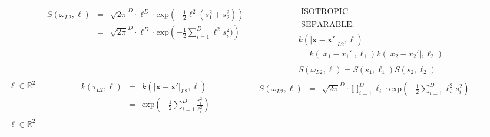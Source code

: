 \documentclass[onecolumn,a4paper,11pt]{article}
\begin{document}
\begin{landscape}
\begin{table}[H]
\begin{center}
\begin{tabular}{|c|c|c|c|}
       & \multicolumn{1}{|p{8.2cm}|}{\small
         \begin{eqnarray*}
		S(\omega_{L2},\ell) &=& \sqrt{2\pi}^D \cdot \ell^D \cdot \mathrm{exp}\left(-\frac{1}{2} \ell^2 (s_1^2 + s_2^2) \right) \\
		&=& \sqrt{2\pi}^D \cdot \ell^D \cdot \mathrm{exp}\left(-\frac{1}{2} \sum_{i=1}^D \ell^2 s_i^2) \right)
         \end{eqnarray*}
       }
       
       & \multicolumn{1}{|p{6.2cm}|}{\small
         \begin{eqnarray*}
        &&\text{-ISOTROPIC}\\
        \\
		&&\text{-SEPARABLE:} \\
		\\
		&&k(|\bm{x}-\bm{x}'|_{L2},\bm{\ell})\\
		 &&= k(|x_1-x_1'|,\ell_1)k(|x_2-x_2'|,\ell_2)\\
		 \\
		&&S(\omega_{L2},\bm{\ell})= S(s_1,\ell_1)S(s_2,\ell_2)
         \end{eqnarray*}
       }\\
        \cline{1-3}
         
       \multicolumn{1}{|p{1.5cm}|}{
       \vspace{1mm}
       $\bm{\ell} \in \mathbb{R}^2$
       }
       
         & \multicolumn{1}{|p{7.2cm}|}{\small
         \begin{eqnarray*}
		k(\tau_{L2},\bm{\ell}) &=& k(|\bm{x}-\bm{x}'|_{L2},\bm{\ell})\\
		&=& \mathrm{exp}\left(-\frac{1}{2} \sum_{i=1}^{D}\frac{r_i^2}{\ell_i^2} \right)
         \end{eqnarray*}
       }
       
       & \multicolumn{1}{|p{8.2cm}|}{\small
       \begin{eqnarray*}
		S(\omega_{L2},\bm{\ell}) &=& \sqrt{2\pi}^D \cdot \prod_{i=1}^D \ell_i \cdot \mathrm{exp}\left(-\frac{1}{2} \sum_{i=1}^D \ell_i^2 s_i^2 \right)
	   \end{eqnarray*}
       }
       
       & \multicolumn{1}{|p{6.2cm}|}{\small

       } \\  
       
       \cline{1-3}
       
       \multicolumn{1}{|p{1.5cm}|}{
       \vspace{1mm}
       $\bm{\ell} \in \mathbb{R}^2$
       
}
\end{tabular}
\end{center}
\end{table}
\end{landscape}
\end{document}
